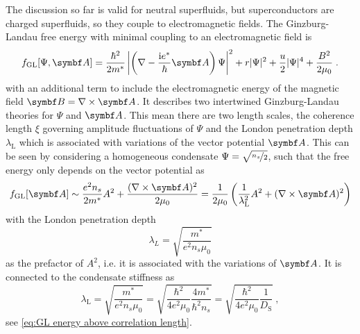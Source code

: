 \documentclass[../main.tex]{subfiles}
\begin{document}
The discussion so far is valid for neutral superfluids, but superconductors are charged superfluids, so they couple to electromagnetic fields.
The Ginzburg-Landau free energy with minimal coupling to an electromagnetic field is
\begin{equation}
	f_{\mathrm{GL}} [\Psi, \vb{A}] = \frac{\hbar^2}{2 m^*} \left\vert \left(\nabla - \frac{\iu e^*}{\hbar} \vb{A} \right) \Psi \right\vert^2 + r \vert \Psi \vert^2 + \frac{u}{2} \vert \Psi \vert^4 + \frac{B^2}{2 \mu_0}
	\label{eq:GL energy with minimal coupling to EM field} \;.
\end{equation}
with an additional term to include the electromagnetic energy of the magnetic field \(\vb{B} = \nabla \times \vb{A}\).
It describes two intertwined Ginzburg-Landau theories for \(\Psi\) and \(\vb{A}\).
This mean there are two length scales, the coherence length \(\xi\) governing amplitude fluctuations of \(\Psi\) and the London penetration depth \(\lambda_{\mathrm{L}}\) which is associated with variations of the vector potential \(\vb{A}\).
This can be seen by considering a homogeneous condensate \(\Psi = \sqrt{\nicefrac{n_s}{2}}\), such that the free energy only depends on the vector potential as
\begin{equation}
	f_{\mathrm{GL}} [\vb{A}] \sim \frac{e^2 n_s}{2 m^*} A^2 + \frac{(\nabla \times \vb{A})^2}{2 \mu_0} = \frac{1}{2 \mu_0} \left( \frac{1}{\lambda_{\mathrm{L}}^2} A^2 + (\nabla \times \vb{A})^2 \right)
\end{equation}
with the London penetration depth
\begin{equation}
	\lambda_L = \sqrt{\frac{m^*}{e^2 n_s \mu_0}}
\end{equation}
as the prefactor of \(A^2\), i.e. it is associated with the variations of \(\vb{A}\).
It is connected to the condensate stiffness as
\begin{equation}
	\lambda_{\mathrm{L}} = \sqrt{\frac{m^*}{e^2 n_s \mu_0}} = \sqrt{\frac{\hbar^2}{4 e^2 \mu_0} \frac{4 m^*}{\hbar^2 n_s}} = \sqrt{\frac{\hbar^2}{4 e^2 \mu_0} \frac{1}{D_{\mathrm{S}}}} \:,
	\label{eq:London penetration depth and D_S}
\end{equation}
see \cref{eq:GL energy above correlation length}.
\end{document}
